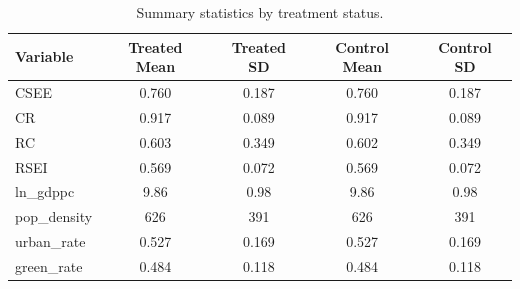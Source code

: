 \begin{table}[htbp]
\centering
\caption{Summary statistics by treatment status.}
\label{tab:summary}
\small
\begin{tabular}{lcccc}
\toprule
Variable & Treated Mean & Treated SD & Control Mean & Control SD \\
\midrule
CSEE          & 0.760 & 0.187 & 0.760 & 0.187 \\
CR            & 0.917 & 0.089 & 0.917 & 0.089 \\
RC            & 0.603 & 0.349 & 0.602 & 0.349 \\
RSEI          & 0.569 & 0.072 & 0.569 & 0.072 \\
ln\_gdppc     & 9.86  & 0.98  & 9.86  & 0.98  \\
pop\_density  & 626   & 391   & 626   & 391   \\
urban\_rate   & 0.527 & 0.169 & 0.527 & 0.169 \\
green\_rate   & 0.484 & 0.118 & 0.484 & 0.118 \\
\bottomrule
\end{tabular}
\end{table}
